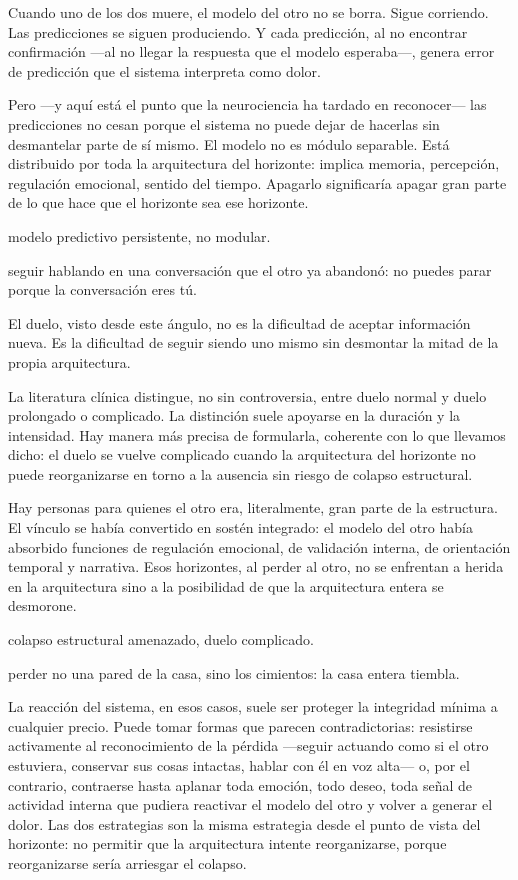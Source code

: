 Cuando uno de los dos muere, el modelo del otro no se borra. Sigue corriendo. Las predicciones se siguen produciendo. Y cada predicción, al no encontrar confirmación —al no llegar la respuesta que el modelo esperaba—, genera error de predicción que el sistema interpreta como dolor.

Pero —y aquí está el punto que la neurociencia ha tardado en reconocer— las predicciones no cesan porque el sistema no puede dejar de hacerlas sin desmantelar parte de sí mismo. El modelo no es módulo separable. Está distribuido por toda la arquitectura del horizonte: implica memoria, percepción, regulación emocional, sentido del tiempo. Apagarlo significaría apagar gran parte de lo que hace que el horizonte sea ese horizonte.

\begin{fisica}
 modelo predictivo persistente, no modular.

 seguir hablando en una conversación que el otro ya abandonó: no puedes parar porque la conversación eres tú.
\end{fisica}
El duelo, visto desde este ángulo, no es la dificultad de aceptar información nueva. Es la dificultad de seguir siendo uno mismo sin desmontar la mitad de la propia arquitectura.

\noindent La literatura clínica distingue, no sin controversia, entre duelo normal y duelo prolongado o complicado. La distinción suele apoyarse en la duración y la intensidad. Hay manera más precisa de formularla, coherente con lo que llevamos dicho: el duelo se vuelve complicado cuando la arquitectura del horizonte no puede reorganizarse en torno a la ausencia sin riesgo de colapso estructural.

Hay personas para quienes el otro era, literalmente, gran parte de la estructura. El vínculo se había convertido en sostén integrado: el modelo del otro había absorbido funciones de regulación emocional, de validación interna, de orientación temporal y narrativa. Esos horizontes, al perder al otro, no se enfrentan a herida en la arquitectura sino a la posibilidad de que la arquitectura entera se desmorone.

\begin{fisica}
 colapso estructural amenazado, duelo complicado.

 perder no una pared de la casa, sino los cimientos: la casa entera tiembla.
\end{fisica}
La reacción del sistema, en esos casos, suele ser proteger la integridad mínima a cualquier precio. Puede tomar formas que parecen contradictorias: resistirse activamente al reconocimiento de la pérdida —seguir actuando como si el otro estuviera, conservar sus cosas intactas, hablar con él en voz alta— o, por el contrario, contraerse hasta aplanar toda emoción, todo deseo, toda señal de actividad interna que pudiera reactivar el modelo del otro y volver a generar el dolor. Las dos estrategias son la misma estrategia desde el punto de vista del horizonte: no permitir que la arquitectura intente reorganizarse, porque reorganizarse sería arriesgar el colapso.

